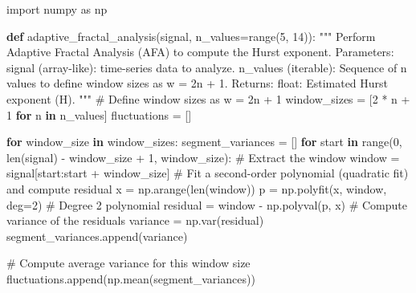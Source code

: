 \documentclass[
  sn-vancouver,
  Numbered,
  referee,
  lineno]{sn-jnl}
\newenvironment{Shaded}{\begin{snugshade}}{\end{snugshade}}
\newcommand{\BuiltInTok}[1]{\textcolor[rgb]{0.00,0.23,0.31}{#1}}
\newcommand{\CommentTok}[1]{\textcolor[rgb]{0.37,0.37,0.37}{#1}}
\newcommand{\ControlFlowTok}[1]{\textcolor[rgb]{0.00,0.23,0.31}{\textbf{#1}}}
\newcommand{\DecValTok}[1]{\textcolor[rgb]{0.68,0.00,0.00}{#1}}
\newcommand{\ImportTok}[1]{\textcolor[rgb]{0.00,0.46,0.62}{#1}}
\newcommand{\KeywordTok}[1]{\textcolor[rgb]{0.00,0.23,0.31}{\textbf{#1}}}
\newcommand{\NormalTok}[1]{\textcolor[rgb]{0.00,0.23,0.31}{#1}}
\newcommand{\OperatorTok}[1]{\textcolor[rgb]{0.37,0.37,0.37}{#1}}
\begin{document}
\begin{Shaded}
\begin{Highlighting}[]
\ImportTok{import}\NormalTok{ numpy }\ImportTok{as}\NormalTok{ np}

\KeywordTok{def}\NormalTok{ adaptive\_fractal\_analysis(signal, n\_values}\OperatorTok{=}\BuiltInTok{range}\NormalTok{(}\DecValTok{5}\NormalTok{, }\DecValTok{14}\NormalTok{)):}
    \CommentTok{"""}
\CommentTok{    Perform Adaptive Fractal Analysis (AFA) to compute the Hurst exponent.}
\CommentTok{    }
\CommentTok{    Parameters:}
\CommentTok{        signal (array{-}like): time{-}series data to analyze.}
\CommentTok{        n\_values (iterable): Sequence of \textasciigrave{}n\textasciigrave{} values to define window sizes as w = 2n + 1.}
\CommentTok{    }
\CommentTok{    Returns:}
\CommentTok{        float: Estimated Hurst exponent (H).}
\CommentTok{    """}
    \CommentTok{\# Define window sizes as w = 2n + 1}
\NormalTok{    window\_sizes }\OperatorTok{=}\NormalTok{ [}\DecValTok{2} \OperatorTok{*}\NormalTok{ n }\OperatorTok{+} \DecValTok{1} \ControlFlowTok{for}\NormalTok{ n }\KeywordTok{in}\NormalTok{ n\_values]}
\NormalTok{    fluctuations }\OperatorTok{=}\NormalTok{ []}

    \ControlFlowTok{for}\NormalTok{ window\_size }\KeywordTok{in}\NormalTok{ window\_sizes:}
\NormalTok{        segment\_variances }\OperatorTok{=}\NormalTok{ []}
        \ControlFlowTok{for}\NormalTok{ start }\KeywordTok{in} \BuiltInTok{range}\NormalTok{(}\DecValTok{0}\NormalTok{, }\BuiltInTok{len}\NormalTok{(signal) }\OperatorTok{{-}}\NormalTok{ window\_size }\OperatorTok{+} \DecValTok{1}\NormalTok{, window\_size):}
            \CommentTok{\# Extract the window}
\NormalTok{            window }\OperatorTok{=}\NormalTok{ signal[start:start }\OperatorTok{+}\NormalTok{ window\_size]}
            \CommentTok{\# Fit a second{-}order polynomial (quadratic fit) and compute residual}
\NormalTok{            x }\OperatorTok{=}\NormalTok{ np.arange(}\BuiltInTok{len}\NormalTok{(window))}
\NormalTok{            p }\OperatorTok{=}\NormalTok{ np.polyfit(x, window, deg}\OperatorTok{=}\DecValTok{2}\NormalTok{)  }\CommentTok{\# Degree 2 polynomial}
\NormalTok{            residual }\OperatorTok{=}\NormalTok{ window }\OperatorTok{{-}}\NormalTok{ np.polyval(p, x)}
            \CommentTok{\# Compute variance of the residuals}
\NormalTok{            variance }\OperatorTok{=}\NormalTok{ np.var(residual)}
\NormalTok{            segment\_variances.append(variance)}
        
        \CommentTok{\# Compute average variance for this window size}
\NormalTok{        fluctuations.append(np.mean(segment\_variances))}


\end{Highlighting}
\end{Shaded}
\end{document}
